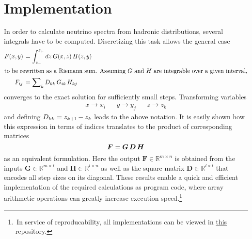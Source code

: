 \section{Implementation}
\label{sec:implementation}

In order to calculate neutrino spectra from hadronic distributions, several integrals have to be computed. Discretizing
this task allows the general case
\begin{align*}
	F(x, y) \kern+1.5pt &= \int_{z_{-}}^{z_{+}} dz \: G(x, z) \, H(z, y) \\
	\intertext{to be rewritten as a Riemann sum. Assuming $G$ and $H$ are integrable over a given interval,}
	F_{ij} \kern+1.8pt &= \sum\nolimits_k D_{kk} \, G_{ik} \, H_{kj}
\end{align*}
converges to the exact solution for sufficiently small steps. Transforming variables
\begin{align*}
	&&&& x \rightarrow x_i && y \rightarrow y_j && z \rightarrow z_k &&&&
\end{align*}
and defining $D_{kk} = z_{k+1} \kern-1.0pt - z_k$ leads to the above notation. It is easily shown how this expression in terms of
indices translates to the product of corresponding matrices
\begin{equation*}
	\bm{F} \kern+0.6pt = \bm{G} \, \bm{D} \, \bm{H}
\end{equation*}
as an equivalent formulation. Here the output $\bm{F} \in \mathbb{R}^{m \times n}$ is obtained from the inputs
$\bm{G} \in \mathbb{R}^{m \times l}$ and $\bm{H} \in \mathbb{R}^{l \times n}$ as well as the square matrix
$\bm{D} \in \mathbb{R}^{l \times l}$ that encodes all step sizes on its diagonal. These results enable a quick and
efficient implementation of the required calculations as program code, where array arithmetic operations can greatly
increase execution speed.\footnote{$\,$In service of reproducability, all implementations can be viewed in
\href{https://github.com/fritzali/bachelor}{this} repository.}
